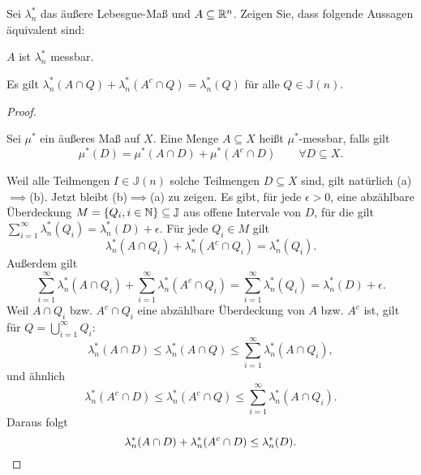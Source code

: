 \begin{Problem}
	Sei $\lambda^*_n$ das äußere Lebesgue-Maß und $A \subseteq \mathbb{R}^n$. Zeigen Sie, dass folgende Aussagen äquivalent sind:
	\begin{parts}
		\item $A$ ist $\lambda_n^*$ messbar.
		\item Es gilt $\lambda_n^*\left( A\cap Q \right) +\lambda_n^*\left( A^c\cap Q \right) =\lambda_n^*(Q)$ f\"{u}r alle $Q\in \mathbb{J}(n)$.
	\end{parts}
\end{Problem}
\begin{proof}
	\begin{Definition}
	Sei $\mu^*$ ein äußeres Maß auf $X$. Eine Menge $A\subseteq X$ heißt $\mu^*$-messbar, falls gilt
	\[
		\mu^*(D)=\mu^*(A\cap D)+\mu^*(A^c\cap D)\qquad \forall D\subseteq X
	.\] 
	\end{Definition}
	Weil alle Teilmengen $I\in \mathbb{J}(n)$ solche Teilmengen $D\subseteq X$ sind, gilt natürlich (a)$\implies$(b). Jetzt bleibt (b)$\implies$(a) zu zeigen. Es gibt, f\"{u}r jede $\epsilon>0$, eine abzählbare Überdeckung $M=\left\{ Q_i, i\in \mathbb{N} \right\} \subseteq \mathbb{J}$ aus offene Intervale von $D$, f\"{u}r die gilt $\sum_{i=1}^{\infty} \lambda_n^*(Q_i)=\lambda_n^*(D)+\epsilon$. F\"{u}r jede $Q_i\in M$ gilt
	\[
		\lambda_n^*\left( A\cap Q_i \right) +\lambda_n^*\left( A^c\cap Q_i \right) =\lambda_n^*(Q_i)
	.\] 
	Außerdem gilt
	\[
	\sum_{i=1}^{\infty} \lambda_n^*\left( A\cap Q_i \right) +\sum_{i=1}^{\infty} \lambda_n^*\left( A^c\cap Q_i \right) =\sum_{i=1}^{\infty} \lambda_n^*(Q_i)=\lambda_n^*(D)+\epsilon
	.\] 
	Weil $A\cap Q_i$ bzw. $A^c\cap Q_i$ eine abzählbare Überdeckung von $A$ bzw. $A^c$ ist, gilt f\"{u}r $Q=\bigcup_{i=1}^\infty Q_i$:
	\[
	\lambda_n^*(A\cap D)\le \lambda_n^*(A \cap Q)\le \sum_{i=1}^{\infty} \lambda_n^*\left( A\cap Q_i \right) 
	,\]
	und ähnlich
	\[
	\lambda_n^*(A^c\cap D)\le \lambda_n^*(A^c\cap Q)\le \sum_{i=1}^{\infty} \lambda_n^*(A\cap Q_i)
	.\] 
	Daraus folgt
	\[
	\lambda_n^*(A\cap D)+\lambda_n^*(A^c\cap D)\le \lambda_n^*(D)
	.\qedhere\] 
\end{proof}

